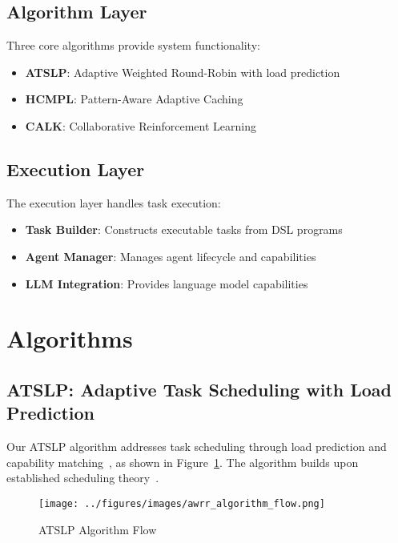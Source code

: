 \documentclass[conference]{IEEEtran}
\begin{document}
\subsection{Algorithm Layer}

Three core algorithms provide system functionality:

\begin{itemize}
\item \textbf{ATSLP}: Adaptive Weighted Round-Robin with load prediction
\item \textbf{HCMPL}: Pattern-Aware Adaptive Caching
\item \textbf{CALK}: Collaborative Reinforcement Learning
\end{itemize}

\subsection{Execution Layer}

The execution layer handles task execution:

\begin{itemize}
\item \textbf{Task Builder}: Constructs executable tasks from DSL programs
\item \textbf{Agent Manager}: Manages agent lifecycle and capabilities
\item \textbf{LLM Integration}: Provides language model capabilities
\end{itemize}

\section{Algorithms}

\subsection{ATSLP: Adaptive Task Scheduling with Load Prediction}

Our ATSLP algorithm addresses task scheduling through load prediction and capability matching~\cite{kleinberg2006algorithm}, as shown in Figure~\ref{fig:atslp}. The algorithm builds upon established scheduling theory~\cite{tanenbaum2016structured}.

\begin{figure}[htbp]
\centering
\texttt{[image: ../figures/images/awrr\_algorithm\_flow.png]}
\caption{ATSLP Algorithm Flow}
\label{fig:atslp}
\end{figure}
\end{document}
